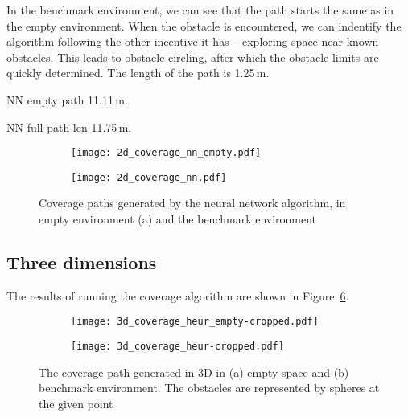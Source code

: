 \documentclass[buriama8_dp.tex]{subfiles}
\begin{document}
In the benchmark environment, we can see that the path starts the same as in the empty environment. When the obstacle is encountered, we can indentify the algorithm following the other incentive it has -- exploring space near known obstacles. This leads to obstacle-circling, after which the obstacle limits are quickly determined. The length of the path is 1.25\,m.




NN empty path 11.11\,m.

NN full path len 11.75\,m.

\begin{figure}[ht]
  \centering
  \begin{subfigure}[t]{0.49\textwidth}
    \texttt{[image: 2d\_coverage\_nn\_empty.pdf]}
    \caption{}
    \label{fig:heur_2d_empty}
  \end{subfigure}
  \begin{subfigure}[t]{0.49\textwidth}
    \texttt{[image: 2d\_coverage\_nn.pdf]}
    \caption{}
    \label{fig:heur_2d_env}
  \end{subfigure}

  \caption[Coverage path -- neural network in 2D]{Coverage paths generated by the neural network algorithm, in empty environment (a) and the benchmark environment}
\end{figure}

\subsection{Three dimensions}
\label{subsec:3d_sim}

The results of running the coverage algorithm are shown in Figure~\ref{fig:heur_3d_coverage}.

\begin{figure}[ht]
  \centering
  \begin{subfigure}[t]{0.48\textwidth}
    \texttt{[image: 3d\_coverage\_heur\_empty-cropped.pdf]}
    \caption{}
    \label{fig:heur_3d_empty}
  \end{subfigure}
  \;
  \begin{subfigure}[t]{0.48\textwidth}
    \texttt{[image: 3d\_coverage\_heur-cropped.pdf]}
    \caption{}
    \label{fig:heur_3d_env}
  \end{subfigure}
  
  \caption[Coverage path -- compact space heuristic in 3D]{The coverage path generated in 3D in (a) empty space and (b) benchmark environment. The obstacles are represented by spheres at the given point}
  \label{fig:heur_3d_coverage}
\end{figure}
\end{document}
